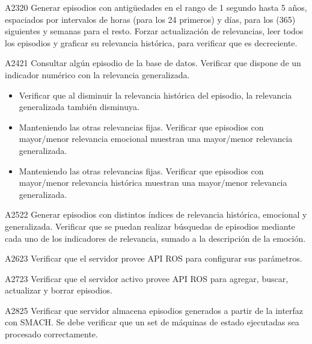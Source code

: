 \begin{def-validacion}{A}{23}{20}
	Generar episodios con antigüedades en el rango de 1 segundo hasta 5 años, espaciados por intervalos de horas (para los 24 primeros) y días, para los (365) siguientes y semanas para el resto. Forzar actualización de relevancias, leer todos los episodios y graficar su relevancia histórica, para verificar que es decreciente.	
\end{def-validacion}

\begin{def-validacion}{A}{24}{21}
	Consultar algún episodio de la base de datos. Verificar que dispone de un indicador numérico con la relevancia generalizada.
	\begin{itemize}
		\item Verificar que al disminuir la relevancia histórica del episodio, la relevancia generalizada también disminuya.
		\item Manteniendo las otras relevancias fijas. Verificar que episodios con mayor/menor relevancia emocional muestran una mayor/menor relevancia generalizada.
		\item Manteniendo las otras relevancias fijas. Verificar que episodios con mayor/menor relevancia histórica muestran una mayor/menor relevancia generalizada.
	\end{itemize}	
\end{def-validacion}

\begin{def-validacion}{A}{25}{22}
	Generar episodios con distintos índices de relevancia histórica, emocional y generalizada. Verificar que se puedan realizar búsquedas de episodios mediante cada uno de los indicadores de relevancia, sumado a la descripción de la emoción.	
\end{def-validacion}

\begin{def-validacion}{A}{26}{23}
Verificar que el servidor provee API ROS para configurar sus parámetros.	
\end{def-validacion}

\begin{def-validacion}{A}{27}{23}
Verificar que el servidor activo provee API ROS para agregar, buscar, actualizar y borrar episodios. 	
\end{def-validacion}

\begin{def-validacion}{A}{28}{25}
Verificar que servidor almacena episodios generados a partir de la interfaz con SMACH. Se debe verificar que un set de máquinas de estado ejecutadas sea procesado correctamente.	
\end{def-validacion}



